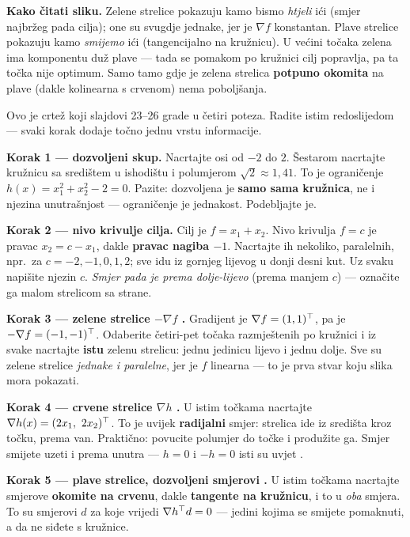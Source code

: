 \textbf{Kako čitati sliku.} Zelene strelice pokazuju kamo bismo \emph{htjeli}
ići (smjer najbržeg pada cilja); one su svugdje jednake, jer je $\nabla f$
konstantan. Plave strelice pokazuju kamo \emph{smijemo} ići (tangencijalno na
kružnicu). U većini točaka zelena ima komponentu duž plave --- tada se pomakom
po kružnici cilj popravlja, pa ta točka nije optimum. Samo tamo gdje je zelena
strelica \textbf{potpuno okomita} na plave (dakle kolinearna s crvenom) nema
poboljšanja.

\begin{crtanje}
Ovo je crtež koji slajdovi 23--26 grade u četiri poteza. Radite istim
redoslijedom --- svaki korak dodaje točno jednu vrstu informacije.

\textbf{Korak 1 --- dozvoljeni skup.} Nacrtajte osi od $-2$ do $2$. Šestarom
nacrtajte kružnicu sa središtem u ishodištu i polumjerom $\sqrt2 \approx 1{,}41$.
To je ograničenje $h(x) = x_1^2 + x_2^2 - 2 = 0$. Pazite: dozvoljena je
\textbf{samo sama kružnica}, ne i njezina unutrašnjost --- ograničenje je
jednakost. Podebljajte je.

\textbf{Korak 2 --- nivo krivulje cilja.} Cilj je $f = x_1 + x_2$. Nivo krivulja
$f = c$ je pravac $x_2 = c - x_1$, dakle \textbf{pravac nagiba $-1$}. Nacrtajte
ih nekoliko, paralelnih, npr.\ za $c = -2, -1, 0, 1, 2$; sve idu iz gornjeg
lijevog u donji desni kut. Uz svaku napišite njezin $c$. \emph{Smjer pada je
prema dolje-lijevo} (prema manjem $c$) --- označite ga malom strelicom sa strane.

\textbf{Korak 3 --- \textcolor{zelena}{zelene} strelice $-\nabla f$
.} Gradijent je $\nabla f = (1,1)^{\top}$, pa je $-\nabla f = (-1,-1)^{\top}$.
Odaberite četiri-pet točaka razmještenih po kružnici i iz svake nacrtajte
\textbf{istu} zelenu strelicu: jednu jedinicu lijevo i jednu dolje. Sve su
zelene strelice \emph{jednake i paralelne}, jer je $f$ linearna --- to je prva
stvar koju slika mora pokazati.

\textbf{Korak 4 --- \textcolor{fsbcrvena}{crvene} strelice $\nabla h$
.} U istim točkama nacrtajte $\nabla h(x) = (2x_1,\ 2x_2)^{\top}$. To je
uvijek \textbf{radijalni} smjer: strelica ide iz središta kroz točku, prema van.
Praktično: povucite polumjer do točke i produžite ga. Smjer smijete uzeti i
prema unutra --- $h = 0$ i $-h = 0$ isti su uvjet .

\textbf{Korak 5 --- \textcolor{tamnoplava}{plave} strelice, dozvoljeni smjerovi
.} U istim točkama nacrtajte smjerove \textbf{okomite na crvenu}, dakle
\textbf{tangente na kružnicu}, i to u \emph{oba} smjera. To su smjerovi $d$ za
koje vrijedi $\nabla h^{\top} d = 0$ --- jedini kojima se smijete pomaknuti, a da ne
siđete s kružnice.


\end{crtanje}
